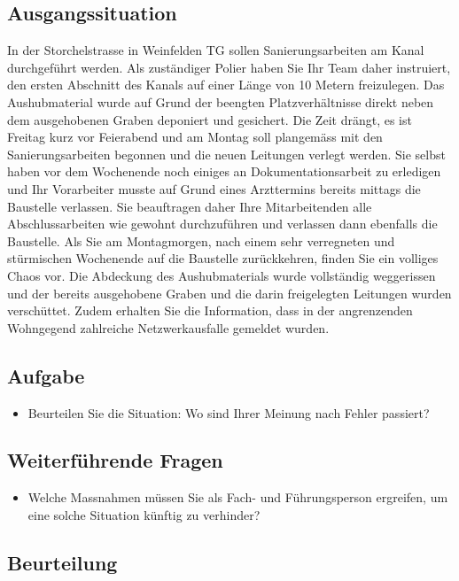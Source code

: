 \subsection*{Ausgangssituation}
In der Storchelstrasse in Weinfelden TG sollen Sanierungsarbeiten am Kanal durchgeführt werden. Als zuständiger Polier haben Sie Ihr Team daher instruiert, den ersten Abschnitt des Kanals auf einer Länge von 10 Metern freizulegen. Das Aushubmaterial wurde auf Grund der beengten Platzverhältnisse direkt neben dem ausgehobenen Graben deponiert und gesichert. Die Zeit drängt, es ist Freitag kurz vor Feierabend und am Montag soll plangemäss mit den Sanierungsarbeiten begonnen und die neuen Leitungen verlegt werden. Sie selbst haben vor dem Wochenende noch einiges an Dokumentationsarbeit zu erledigen und Ihr Vorarbeiter musste auf Grund eines Arzttermins bereits mittags die Baustelle verlassen. Sie beauftragen daher Ihre Mitarbeitenden alle Abschlussarbeiten wie gewohnt durchzuführen und verlassen dann ebenfalls die Baustelle. Als Sie am Montagmorgen, nach einem sehr verregneten und stürmischen Wochenende auf die Baustelle zurückkehren, finden Sie ein volliges Chaos vor. Die Abdeckung des Aushubmaterials wurde vollständig weggerissen und der bereits ausgehobene Graben und die darin freigelegten Leitungen wurden verschüttet. Zudem erhalten Sie die Information, dass in der angrenzenden Wohngegend zahlreiche Netzwerkausfalle gemeldet wurden.

\subsection*{Aufgabe}
\begin{itemize}
    \item Beurteilen Sie die Situation: Wo sind Ihrer Meinung nach Fehler passiert?
\end{itemize}

\subsection*{Weiterführende Fragen}
\begin{itemize}
    \item Welche Massnahmen müssen Sie als Fach- und Führungsperson ergreifen, um eine solche Situation künftig zu verhinder?
\end{itemize}

\subsection*{Beurteilung}

